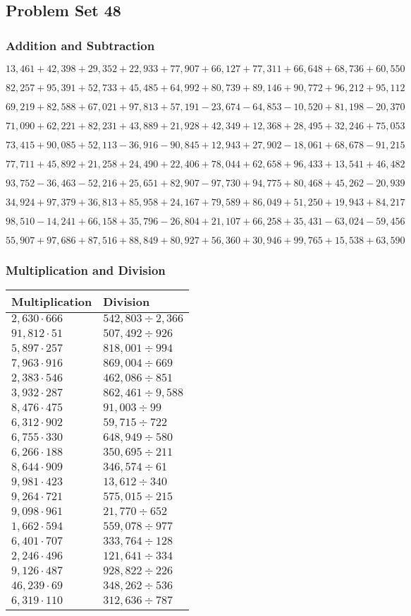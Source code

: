 \hypertarget{problem-set-48-3}{%
\subsection{Problem Set 48}\label{problem-set-48-3}}

\hypertarget{addition-and-subtraction-270}{%
\subsubsection{Addition and
Subtraction}\label{addition-and-subtraction-270}}

\(13,461+42,398+29,352+22,933+77,907+66,127+77,311+66,648+68,736+ 60,550\)

\(82,257+95,391+52,733+45,485+64,992+80,739+89,146+90,772+96,212+95,112\)

\(69,219+82,588+67,021+97,813+57,191-23,674-64,853-10,520+81,198-20,370\)

\(71,090+62,221+82,231+43,889+21,928+42,349+12,368+28,495+32,246+75,053\)

\(73,415+90,085+52,113-36,916-90,845+12,943+27,902-18,061+68,678-91,215\)

\(77,711+45,892+21,258+24,490+22,406+78,044+62,658+96,433+13,541+46,482\)

\(93,752-36,463-52,216+25,651+82,907-97,730+94,775+80,468+45,262-20,939\)

\(34,924+97,379+36,813+85,958+24,167+79,589+86,049+51,250+19,943+84,217\)

\(98,510-14,241+66,158+35,796-26,804+21,107+66,258+35,431-63,024-59,456\)

\(55,907+97,686+87,516+88,849+80,927+56,360+30,946+99,765+15,538+63,590\)

\hypertarget{multiplication-and-division-269}{%
\subsubsection{Multiplication and
Division}\label{multiplication-and-division-269}}

\begin{longtable}[]{@{}ll@{}}
\toprule
Multiplication & Division\tabularnewline
\midrule
\endhead
\(2,630\cdot666\) & \(542,803÷2,366\)\tabularnewline
\(91,812\cdot51\) & \(507,492÷926\)\tabularnewline
\(5,897\cdot257\) & \(818,001÷994\)\tabularnewline
\(7,963\cdot916\) & \(869,004÷669\)\tabularnewline
\(2,383\cdot546\) & \(462,086÷851\)\tabularnewline
\(3,932\cdot287\) & \(862,461÷9,588\)\tabularnewline
\(8,476\cdot475\) & \(91,003÷99\)\tabularnewline
\(6,312\cdot902\) & \(59,715÷722\)\tabularnewline
\(6,755\cdot330\) & \(648,949÷580\)\tabularnewline
\(6,266\cdot188\) & \(350,695÷211\)\tabularnewline
\(8,644\cdot909\) & \(346,574÷61\)\tabularnewline
\(9,981\cdot423\) & \(13,612÷340\)\tabularnewline
\(9,264\cdot721\) & \(575,015÷215\)\tabularnewline
\(9,098\cdot961\) & \(21,770÷652\)\tabularnewline
\(1,662\cdot594\) & \(559,078÷977\)\tabularnewline
\(6,401\cdot707\) & \(333,764÷128\)\tabularnewline
\(2,246\cdot496\) & \(121,641÷334\)\tabularnewline
\(9,126\cdot487\) & \(928,822÷226\)\tabularnewline
\(46,239\cdot69\) & \(348,262÷536\)\tabularnewline
\(6,319\cdot110\) & \(312,636÷787\)\tabularnewline
\bottomrule
\end{longtable}

